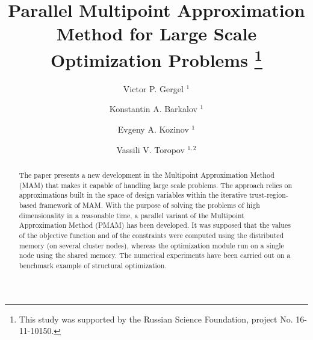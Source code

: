 \documentclass[runningheads,a4paper]{llncs}
\begin{document}
\mainmatter  %

\title{Parallel Multipoint Approximation Method for Large Scale Optimization Problems 
\thanks{This study was supported by the Russian Science Foundation, project No. 16-11-10150.}}


\author{ Victor P. Gergel%
$^1$ \and
Konstantin A. Barkalov%
$^1$ \and
Evgeny A. Kozinov%
$^1$ \and
Vassili V. Toropov%
$^{1,2}$
}
%


%
%

\maketitle

\begin{abstract}
The paper presents a new development in the Multipoint Approximation Method (MAM) that makes it capable of handling large scale problems. The approach relies on approximations built in the space of design variables within the iterative trust-region-based framework of MAM. 
With the purpose of solving the problems of high dimensionality in a reasonable time, a parallel variant of the Multipoint Approximation Method (PMAM) has been developed. It was supposed that the values of the objective function and of the constraints were computed using the distributed memory (on several cluster nodes), whereas the optimization module run on a single node using the shared memory. The numerical experiments have been carried out on a benchmark example of structural optimization.

\end{abstract}
\end{document}
